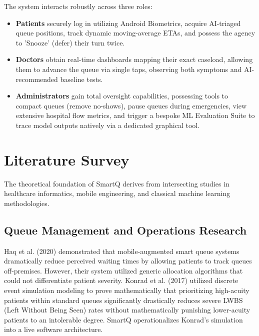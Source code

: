 \documentclass[12pt,a4paper]{article}
\begin{document}
The system interacts robustly across three roles:
\begin{itemize}
    \item \textbf{Patients} securely log in utilizing Android Biometrics, acquire AI-triaged queue positions, track dynamic moving-average ETAs, and possess the agency to 'Snooze' (defer) their turn twice.
    \item \textbf{Doctors} obtain real-time dashboards mapping their exact caseload, allowing them to advance the queue via single taps, observing both symptoms and AI-recommended baseline tests.
    \item \textbf{Administrators} gain total oversight capabilities, possessing tools to compact queues (remove no-shows), pause queues during emergencies, view extensive hospital flow metrics, and trigger a bespoke ML Evaluation Suite to trace model outputs natively via a dedicated graphical tool.
\end{itemize}

\section{Literature Survey}

The theoretical foundation of SmartQ derives from intersecting studies in healthcare informatics, mobile engineering, and classical machine learning methodologies.

\subsection{Queue Management and Operations Research}
Haq et al. (2020) demonstrated that mobile-augmented smart queue systems dramatically reduce perceived waiting times by allowing patients to track queues off-premises. However, their system utilized generic allocation algorithms that could not differentiate patient severity. Konrad et al. (2017) utilized discrete event simulation modeling to prove mathematically that prioritizing high-acuity patients within standard queues significantly drastically reduces severe LWBS (Left Without Being Seen) rates without mathematically punishing lower-acuity patients to an intolerable degree. SmartQ operationalizes Konrad's simulation into a live software architecture.
\end{document}
